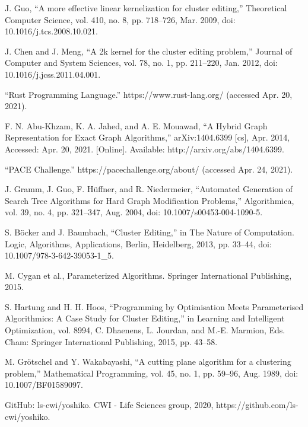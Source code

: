\documentclass[12pt,oneside,english,parskip=full,headings=small]{scrbook}
\theoremstyle{definition}
\begin{document}
\begin{thebibliography}{99}
J. Guo, “A more effective linear kernelization for cluster editing,” Theoretical
Computer Science, vol. 410, no. 8, pp. 718–726, Mar. 2009, doi: 10.1016/j.tcs.2008.10.021.

J. Chen and J. Meng, “A 2k kernel for the cluster editing problem,” Journal of Computer and
System Sciences, vol. 78, no. 1, pp. 211–220, Jan. 2012, doi: 10.1016/j.jcss.2011.04.001.

“Rust Programming Language.” https://www.rust-lang.org/ (accessed Apr. 20, 2021).

F. N. Abu-Khzam, K. A. Jahed, and A. E. Mouawad, “A Hybrid Graph Representation for Exact Graph
Algorithms,” arXiv:1404.6399 [cs], Apr. 2014, Accessed: Apr. 20, 2021. [Online]. Available:
http://arxiv.org/abs/1404.6399.

“PACE Challenge.” https://pacechallenge.org/about/ (accessed Apr. 24, 2021).

J. Gramm, J. Guo, F. Hüffner, and R. Niedermeier, “Automated Generation of Search Tree Algorithms
for Hard Graph Modification Problems,” Algorithmica, vol. 39, no. 4, pp. 321–347, Aug. 2004, doi:
10.1007/s00453-004-1090-5.

S. Böcker and J. Baumbach, “Cluster Editing,” in The Nature of Computation. Logic, Algorithms,
Applications, Berlin, Heidelberg, 2013, pp. 33–44, doi: 10.1007/978-3-642-39053-1\_5.

M. Cygan et al., Parameterized Algorithms. Springer International Publishing, 2015.

S. Hartung and H. H. Hoos, “Programming by Optimisation Meets Parameterised Algorithmics: A Case
Study for Cluster Editing,” in Learning and Intelligent Optimization, vol. 8994, C. Dhaenens, L.
Jourdan, and M.-E. Marmion, Eds. Cham: Springer International Publishing, 2015, pp. 43–58.

M. Grötschel and Y. Wakabayashi, “A cutting plane algorithm for a clustering problem,”
Mathematical Programming, vol. 45, no. 1, pp. 59–96, Aug. 1989, doi: 10.1007/BF01589097.

GitHub: ls-cwi/yoshiko. CWI - Life Sciences group, 2020, https://github.com/ls-cwi/yoshiko.

\end{thebibliography}
\end{document}
